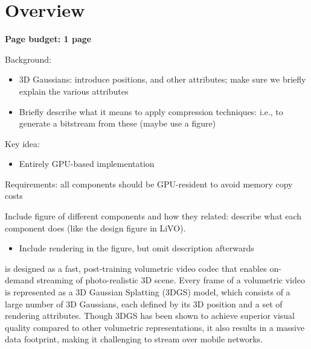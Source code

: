 \section{\gsnfs{} Overview}\label{sec:design-overview}

\begin{outline}
  \textbf{Page budget: 1 page} \status{[Done]}

  Background: \status{[Done]}
  \begin{itemize}
  \item 3D Gaussians: introduce positions, and other attributes; make sure we briefly explain the various attributes
  \item Briefly describe what it means to apply compression techniques: i.e., to generate a bitstream from these (maybe use a figure)
  \end{itemize}

  Key idea: \status{[Done]}
  \begin{itemize}
  \item Entirely GPU-based implementation
  \end{itemize}

  Requirements: all components should be GPU-resident to avoid memory copy costs
  
  Include figure of different components and how they related: describe what each component does (like the design figure in LiVO). \status{[Done]}
  \begin{itemize}
  \item Include rendering in the figure, but omit description afterwards
  \end{itemize}
  
\end{outline}

\gsnfs is designed as a fast, post-training volumetric video codec that enables on-demand streaming of photo-realistic 3D scene. Every frame of a volumetric video is represented as a 3D Gaussian Splatting (3DGS) model, which consists of a large number of 3D Gaussians, each defined by its 3D position and a set of rendering attributes. Though 3DGS has been shown to achieve superior visual quality compared to other volumetric representations, it also results in a massive data footprint, making it challenging to stream over mobile networks.

